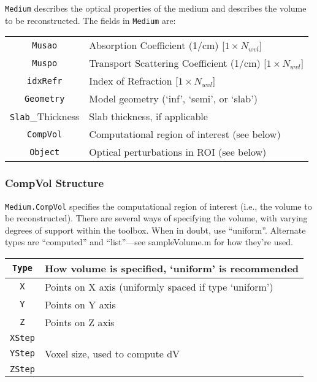 \documentclass[12pt]{article}
\newcommand{\pmifield}[1]{{\tt #1}}
\begin{document}
\pmifield{Medium} describes the optical properties of the medium and
describes the volume to be reconstructed.  The fields in
\pmifield{Medium} are: 
\begin{center}
\begin{tabular}{|c|l|}
\hline
\pmifield{Musao}          & Absorption Coefficient (1/cm) [$1\times N_{wvl}$]\\
\pmifield{Muspo}          & Transport Scattering Coefficient 
				(1/cm) [$1\times N_{wvl}$]\\
\pmifield{idxRefr}        & Index of Refraction [$1\times N_{wvl}$]\\
\hline
\pmifield{Geometry}       & Model geometry (`inf', `semi', or `slab')\\
\pmifield{Slab}\_Thickness& Slab thickness, if applicable \\
\pmifield{CompVol}        & Computational region of interest (see below) \\
\hline
\pmifield{Object}         & Optical perturbations in ROI (see below) \\
\hline
\end{tabular}
\end{center}

\subsubsection{CompVol Structure}

\pmifield{Medium.CompVol} specifies the computational region of
interest (i.e., the volume to be reconstructed).  There are several
ways of specifying the volume, with varying degrees of support within
the toolbox.  When in doubt, use ``uniform''.  Alternate types
are ``computed'' and ``list''---see sampleVolume.m for how they're used.

\begin{center}
\begin{tabular}{|c|l|}
\hline
\pmifield{Type}  & How volume is specified, `uniform' is recommended \\
\hline
\pmifield{X}     & Points on X axis (uniformly spaced if type `uniform') \\
\pmifield{Y}     & Points on Y axis \\
\pmifield{Z}     & Points on Z axis \\
\hline
\pmifield{XStep} & \\
\pmifield{YStep} & Voxel size, used to compute dV \\
\pmifield{ZStep} & \\
\hline
\end{tabular}
\end{center}
\end{document}

